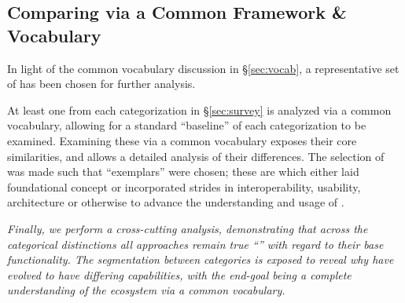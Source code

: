 \documentclass{sig-alternate}
\begin{document}


\subsection{Comparing \pilotjobs via a Common Framework \& Vocabulary}
In light of the common vocabulary discussion in 
\S\ref{sec:vocab}, a representative set of \pilotjobs
has been chosen for further analysis.  

At least one \pilotjob from each categorization in
\S\ref{sec:survey} is analyzed via a common
vocabulary, allowing for a standard
``baseline'' of each \pilotjob categorization to be
examined.  Examining these \pilotjobs via a
common vocabulary exposes their core similarities, and allows a
detailed analysis of their differences.  The selection of
\pilotjobs was made such that ``exemplars'' were chosen;
these are \pilotjobs which either laid foundational
\pilotjob concept or incorporated strides in interoperability,
usability, architecture or otherwise to advance the
understanding and usage of \pilotjobs.


\textit{Finally, we perform
a cross-cutting analysis, demonstrating that across the categorical
distinctions all approaches remain true ``\pilotjobs'' with regard
to their base functionality.  The segmentation between categories
is exposed to reveal why \pilotjobs have evolved to have
differing capabilities, with the end-goal being a
complete understanding of the \pilotjob ecosystem via a common
vocabulary.}
\end{document}

